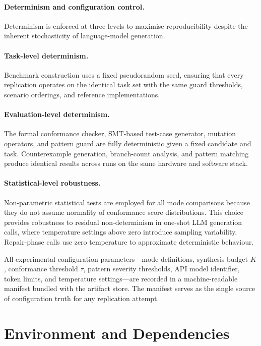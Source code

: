 \paragraph{Determinism and configuration control.}
Determinism is enforced at three levels to maximise reproducibility despite
the inherent stochasticity of language-model generation.

\paragraph{Task-level determinism.}
Benchmark construction uses a fixed pseudorandom seed, ensuring that every
replication operates on the identical task set with the same guard thresholds,
scenario orderings, and reference implementations.

\paragraph{Evaluation-level determinism.}
The formal conformance checker, SMT-based test-case generator, mutation
operators, and pattern guard are fully deterministic given a fixed candidate
and task.  Counterexample generation, branch-count analysis, and pattern
matching produce identical results across runs on the same hardware and
software stack.

\paragraph{Statistical-level robustness.}
Non-parametric statistical tests are employed for all mode comparisons because
they do not assume normality of conformance score distributions.  This choice
provides robustness to residual non-determinism in one-shot LLM generation
calls, where temperature settings above zero introduce sampling variability.
Repair-phase calls use zero temperature to approximate deterministic behaviour.

All experimental configuration parameters---mode definitions, synthesis budget
$K$, conformance threshold $\tau$, pattern severity thresholds, API model
identifier, token limits, and temperature settings---are recorded in a
machine-readable manifest bundled with the artifact store.  The manifest serves
as the single source of configuration truth for any replication attempt.

\section{Environment and Dependencies}
\label{sec:repro:env}

